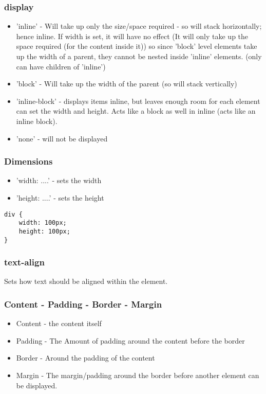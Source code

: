 \documentclass[]{article}
\begin{document}
\subsubsection{display}
\begin{itemize}
	\item 'inline' - Will take up only the size/space required - so will stack horizontally; hence inline.
	\subitem If width is set, it will have no effect (It will only take up the space required (for the content inside it))
	\subitem so since 'block' level elements take up the width of a parent, they cannot be nested inside 'inline' elements.  (only can have children of 'inline')
	
	\item 'block' - Will take up the width of the parent (so will stack vertically)
	
	\item 'inline-block' - displays items inline, but leaves enough room for each element
	\subitem can set the width and height.
	\subitem Acts like a block as well in inline (acts like an inline block).
	
	\item 'none' - will not be displayed
\end{itemize}

\subsubsection{Dimensions}
\begin{itemize}
	\item 'width: ....' - sets the width 
	\item 'height: ....' - sets the height 
\end{itemize}
\begin{lstlisting}
div {
	width: 100px;
	height: 100px;
}
\end{lstlisting}

\subsubsection{text-align}
Sets how text should be aligned within the element.

\subsubsection{Content - Padding - Border - Margin}
\begin{itemize}
	\item Content - the content itself
	\item Padding - The Amount of padding around the content before the border
	\item Border - Around the padding of the content
	\item Margin - The margin/padding around the border before another element can be displayed.
\end{itemize}
\end{document}
